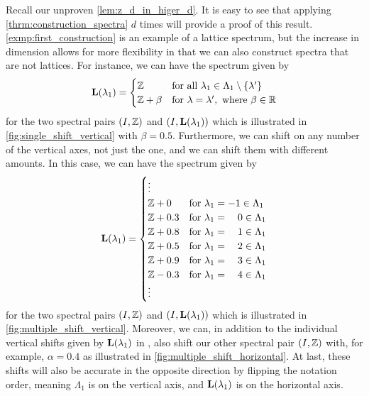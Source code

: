\documentclass[../thesis.tex]{subfiles}
\begin{document}
Recall our unproven \cref{lem:z_d_in_higer_d}. It is easy to see that applying \cref{thrm:construction_spectra} $d$ times will provide a proof of this result. \cref{exmp:first_construction} is an example of a lattice spectrum, but the increase in dimension allows for more flexibility in that we can also construct spectra that are not lattices. For instance, we can have the spectrum given by 
\begin{align}\label{eq:single_shift_func}
    \mathbf{L}(\lambda_1) = \begin{cases}        
        \mathbb{Z} & \text{for all } \lambda_1 \in \Lambda_1\setminus\{\lambda'\}\\        
        \mathbb{Z}+\beta & \text{for } \lambda=\lambda',\text{ where } \beta \in \mathbb{R}   
    \end{cases}
\end{align}
for the two spectral pairs $(I,\mathbb{Z})$ and $(I,\mathbf{L}(\lambda_1))$ which is illustrated in \cref{fig:single_shift_vertical} with $\beta = 0.5$. Furthermore, we can shift on any number of the vertical axes, not just the one, and we can shift them with different amounts. In this case, we can have the spectrum given by 
\begin{align}\label{eq:multiple_shit_func}
    \mathbf{L}(\lambda_1) = \begin{cases}
        \vdots\\        
        \mathbb{Z}+0 & \text{for } \lambda_1 = -1 \in \Lambda_1\\
        \mathbb{Z}+0.3 & \text{for } \lambda_1 = \text{\space\space\space} 0 \in \Lambda_1\\
        \mathbb{Z}+0.8 & \text{for } \lambda_1 = \text{\space\space\space} 1 \in \Lambda_1\\
        \mathbb{Z}+0.5 & \text{for } \lambda_1 = \text{\space\space\space} 2 \in \Lambda_1\\
        \mathbb{Z}+0.9 & \text{for } \lambda_1 = \text{\space\space\space} 3 \in \Lambda_1\\
        \mathbb{Z}-0.3 & \text{for } \lambda_1 = \text{\space\space\space} 4 \in \Lambda_1\\
        \vdots
    \end{cases}
\end{align}
for the two spectral pairs $(I,\mathbb{Z})$ and $(I,\mathbf{L}(\lambda_1))$ which is illustrated in \cref{fig:multiple_shift_vertical}. Moreover, we can, in addition to the individual vertical shifts given by $\mathbf{L}(\lambda_1)$ in , also shift our other spectral pair $(I,\mathbb{Z})$ with, for example, $\alpha = 0.4$ as illustrated in \cref{fig:multiple_shift_horizontal}. At last, these shifts will also be accurate in the opposite direction by flipping the notation order, meaning $\Lambda_1$ is on the vertical axis, and $\mathbf{L}(\lambda_1)$ is on the horizontal axis.
\end{document}

